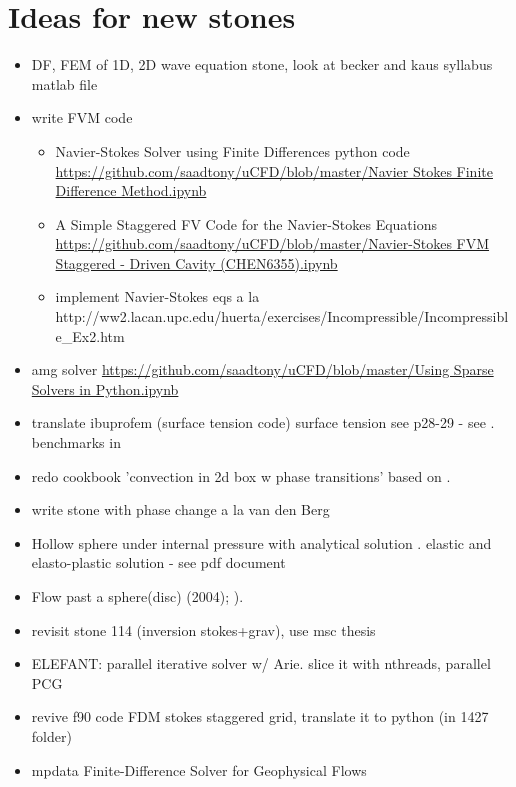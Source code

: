 \documentclass[a4paper]{article}
\begin{document}
\newpage
\section{Ideas for new stones}

\begin{itemize}
\item DF, FEM of 1D, 2D wave equation stone, look at becker and kaus syllabus matlab file
\item write FVM code
\begin{itemize}
\item Navier-Stokes Solver using Finite Differences python code 
\url{https://github.com/saadtony/uCFD/blob/master/Navier Stokes Finite Difference Method.ipynb}
\item A Simple Staggered FV Code for the Navier-Stokes Equations
\url{https://github.com/saadtony/uCFD/blob/master/Navier-Stokes FVM Staggered - Driven Cavity (CHEN6355).ipynb}
\item implement Navier-Stokes eqs a la http://ww2.lacan.upc.edu/huerta/exercises/Incompressible/Incompressible\_Ex2.htm
\end{itemize}

\item amg solver
\url{https://github.com/saadtony/uCFD/blob/master/Using Sparse Solvers in Python.ipynb}

\item translate ibuprofem (surface tension code) surface tension see \cite{reddybook2}p28-29 - 
see \cite{dett04}. benchmarks in \cite{chcc12} 
\item redo  cookbook 'convection in 2d box w phase transitions' based on \textcite{chyu85}. 
\item write stone with phase change a la van den Berg \textcite{vava08}
\item Hollow sphere under internal pressure with analytical solution
. elastic and elasto-plastic solution  - see pdf document
\item Flow past a sphere(disc) \textcite{demj04} (2004); 
      \textcite{gafp17}). 
\item revisit stone 114 (inversion stokes+grav), use msc thesis 
\item ELEFANT:  parallel iterative solver w/ Arie. slice it with nthreads, parallel PCG
\item revive f90 code FDM stokes staggered grid, translate it to python 
(in 1427 folder)
\item mpdata Finite-Difference Solver for Geophysical Flows \cite{smma98}
\end{itemize}
\end{document}
